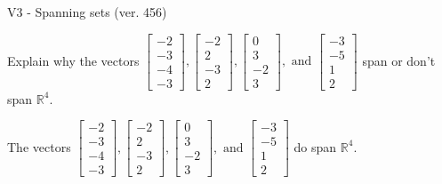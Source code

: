 \begin{exercise}
  \begin{exerciseTitle}V3 - Spanning sets (ver. 456)\end{exerciseTitle}
  \begin{exerciseStatement}
    Explain why the vectors \(\left[\begin{array}{r}
-2 \\
-3 \\
-4 \\
-3
\end{array}\right] , \left[\begin{array}{r}
-2 \\
2 \\
-3 \\
2
\end{array}\right] , \left[\begin{array}{r}
0 \\
3 \\
-2 \\
3
\end{array}\right] , \text{ and } \left[\begin{array}{r}
-3 \\
-5 \\
1 \\
2
\end{array}\right]\) span or don't span \(\mathbb{R}^4\). 
	


  \end{exerciseStatement}
  \begin{exerciseAnswer}
   The vectors \(\left[\begin{array}{r}
-2 \\
-3 \\
-4 \\
-3
\end{array}\right] , \left[\begin{array}{r}
-2 \\
2 \\
-3 \\
2
\end{array}\right] , \left[\begin{array}{r}
0 \\
3 \\
-2 \\
3
\end{array}\right] , \text{ and } \left[\begin{array}{r}
-3 \\
-5 \\
1 \\
2
\end{array}\right]\) 
  	 do  
	span \(\mathbb{R}^4\).
  


  \end{exerciseAnswer}
\end{exercise}